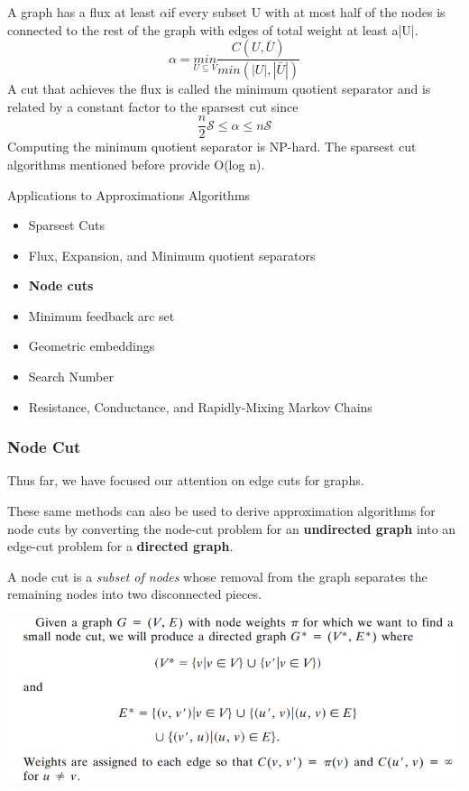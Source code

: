 \begin{frame}
A graph has a flux at least $\alpha$if every subset U with at most half of the nodes is connected to the rest of the graph with edges of total weight at least a|U|. 
$$\alpha = \underset{U\subseteq V}{min} \frac{C( U, \bar{U})}{min(\left | U \right |,\left | \bar{U} \right |)} $$
A cut that achieves the flux is called the minimum quotient separator and is related by a constant factor to the sparsest cut since  
$$ \frac{n}{2} \mathscr{S} \le \alpha \le n \mathscr{S}$$
Computing the minimum quotient separator is NP-hard. The sparsest cut algorithms mentioned before provide O(log n).

\end{frame}



\begin{frame}[t]
\begin{block}{Applications to Approximations Algorithms}
	\begin{itemize}
			\item Sparsest Cuts
            \item Flux, Expansion, and Minimum quotient separators
            \item \textbf{Node cuts}
			\item Minimum feedback arc set
            \item Geometric embeddings
        	\item Search Number
            \item Resistance, Conductance, and Rapidly-Mixing Markov Chains
	 \end{itemize} 
\end{block}
\end{frame}

\begin{frame}
\frametitle{Node Cut}
Thus far, we have focused our attention on edge cuts for graphs.

These same methods can also be used to derive approximation algorithms for node cuts by converting the node-cut problem for an \textbf{undirected graph} into an edge-cut problem for a \textbf{directed graph}.

A node cut is a \textit{subset of nodes} whose removal from the graph separates the remaining nodes into two disconnected pieces.
\end{frame}

\begin{frame}

\centering
\includegraphics[width=\textwidth]{figs/node_cut.png}
\end{frame}

